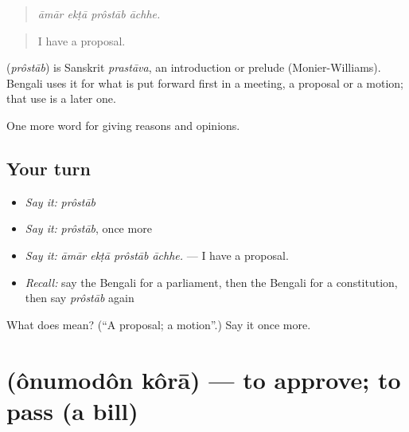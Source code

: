 \begin{quote}
   
\end{quote}

\begin{quote}
\emph{āmār ekṭā prôstāb āchhe.}
\end{quote}

\begin{quote}
I have a proposal.
\end{quote}

\begin{cousinweb}
\textbf{} (\emph{prôstāb}) is Sanskrit \emph{prastāva}, an introduction or prelude (Monier-Williams). Bengali uses it for what is put forward first in a meeting, a proposal or a motion; that use is a later one.
\end{cousinweb}

\begin{grammarlens}[title={What you've built}]
One more word for giving reasons and opinions.
\end{grammarlens}

\subsection*{Your turn}
\begin{itemize}
\raggedright
  \item \emph{Say it:} \emph{prôstāb}
  \item \emph{Say it:} \emph{prôstāb}, once more
  \item \emph{Say it:} \emph{āmār ekṭā prôstāb āchhe.} — I have a proposal.
  \item \emph{Recall:} say the Bengali for a parliament, then the Bengali for a constitution, then say \emph{prôstāb} again
\end{itemize}

\begin{tcolorbox}[breakable,colback=teal!4,colframe=teal!35!black,title={Before you move on}]
What does  mean? (\textquotedblleft{}A proposal; a motion\textquotedblright{}.) Say it once more.
\end{tcolorbox}
\section[\texorpdfstring{\bn{অনুমোদন} \bn{করা} (ônumodôn kôrā)}{অনুমোদন করা (ônumodôn kôrā)}]{  (ônumodôn kôrā) — to approve; to pass (a bill)}

